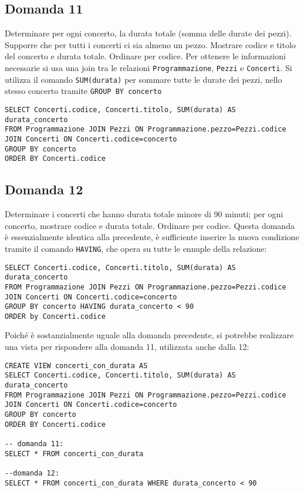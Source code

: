 \documentclass{article}
\numberwithin{equation}{subsection}
\begin{document}
\subsection*{Domanda 11}
Determinare per ogni concerto, la durata totale (somma delle durate dei pezzi). Supporre che per tutti i concerti ci sia almeno un pezzo. Mostrare codice e titolo del concerto e durata totale. Ordinare per codice. 
Per ottenere le informazioni necessarie si usa una join tra le relazioni \verb|Programmazione|, \verb|Pezzi| e \verb|Concerti|. Si utilizza il comando \verb|SUM(durata)| per sommare tutte le durate dei pezzi, nello 
stesso concerto tramite \verb|GROUP BY concerto|  
\begin{verbatim}
SELECT Concerti.codice, Concerti.titolo, SUM(durata) AS durata_concerto
FROM Programmazione JOIN Pezzi ON Programmazione.pezzo=Pezzi.codice
JOIN Concerti ON Concerti.codice=concerto
GROUP BY concerto
ORDER BY Concerti.codice
\end{verbatim}

\subsection*{Domanda 12}
Determinare i concerti che hanno durata totale minore di 90 minuti; per ogni concerto, mostrare codice e durata totale. Ordinare per codice. Questa domanda è essenzialmente identica alla precedente, è 
sufficiente inserire la nuova condizione tramite il comando \verb|HAVING|, che opera su tutte le ennuple della relazione: 
\begin{verbatim}
SELECT Concerti.codice, Concerti.titolo, SUM(durata) AS durata_concerto
FROM Programmazione JOIN Pezzi ON Programmazione.pezzo=Pezzi.codice
JOIN Concerti ON Concerti.codice=concerto
GROUP BY concerto HAVING durata_concerto < 90
ORDER by Concerti.codice
\end{verbatim}
Poiché è sostanzialmente uguale alla domanda precedente, si potrebbe realizzare una vista per rispondere alla domanda 11, utilizzata anche dalla 12:
\begin{verbatim}
CREATE VIEW concerti_con_durata AS
SELECT Concerti.codice, Concerti.titolo, SUM(durata) AS durata_concerto
FROM Programmazione JOIN Pezzi ON Programmazione.pezzo=Pezzi.codice
JOIN Concerti ON Concerti.codice=concerto
GROUP BY concerto
ORDER BY Concerti.codice

-- domanda 11:
SELECT * FROM concerti_con_durata

--domanda 12:
SELECT * FROM concerti_con_durata WHERE durata_concerto < 90
\end{verbatim}
\end{document}
